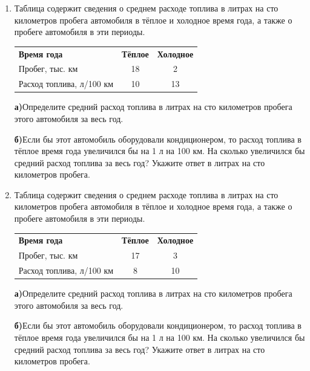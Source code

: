 \documentclass[a4paper,12pt]{article}
\newcommand{\taskspace}{\par\vspace{0.42cm}}
\newcommand{\subtask}[2]{\par\medskip\textbf{#1}\enspace #2\par\vspace{0.22cm}}
\begin{document}
\begin{enumerate}[resume]
\item Таблица содержит сведения о среднем расходе топлива в литрах на сто километров пробега автомобиля в тёплое и холодное время года, а также о пробеге автомобиля в эти периоды.
\begin{center}
\renewcommand{\arraystretch}{1.22}
\begin{tabular}{@{}lcc@{}}\textbf{Время года} & \textbf{Тёплое} & \textbf{Холодное} \\
Пробег, тыс. км & 18 & 2 \\
Расход топлива, л/100 км & 10 & 13\end{tabular}
\end{center}
\subtask{а)}{Определите средний расход топлива в литрах на сто километров пробега этого автомобиля за весь год.}
\subtask{б)}{Если бы этот автомобиль оборудовали кондиционером, то расход топлива в тёплое время года увеличился бы на 1 л на 100 км. На сколько увеличился бы средний расход топлива за весь год? Укажите ответ в литрах на сто километров пробега.}

\taskspace

\item Таблица содержит сведения о среднем расходе топлива в литрах на сто километров пробега автомобиля в тёплое и холодное время года, а также о пробеге автомобиля в эти периоды.
\begin{center}
\renewcommand{\arraystretch}{1.22}
\begin{tabular}{@{}lcc@{}}\textbf{Время года} & \textbf{Тёплое} & \textbf{Холодное} \\
Пробег, тыс. км & 17 & 3 \\
Расход топлива, л/100 км & 8 & 10\end{tabular}
\end{center}
\subtask{а)}{Определите средний расход топлива в литрах на сто километров пробега этого автомобиля за весь год.}
\subtask{б)}{Если бы этот автомобиль оборудовали кондиционером, то расход топлива в тёплое время года увеличился бы на 1 л на 100 км. На сколько увеличился бы средний расход топлива за весь год? Укажите ответ в литрах на сто километров пробега.}

\taskspace


\end{enumerate}
\end{document}
